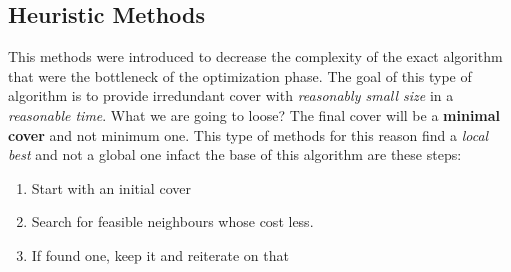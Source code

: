\subsection{Heuristic Methods}

This methods were introduced to decrease the complexity of the exact algorithm that were the bottleneck of the optimization phase. The goal of this type of algorithm is to provide irredundant cover with \textit{reasonably small size} in a \textit{reasonable time}. What we are going to loose? The final cover will be a \textbf{minimal cover} and not minimum one. This type of methods for this reason find a \textit{local best} and not a global one infact the base of this algorithm are these steps:
\begin{enumerate}
	\item Start with an initial cover
	\item Search for feasible neighbours whose cost less.
	\item If found one, keep it and reiterate on that
\end{enumerate}

